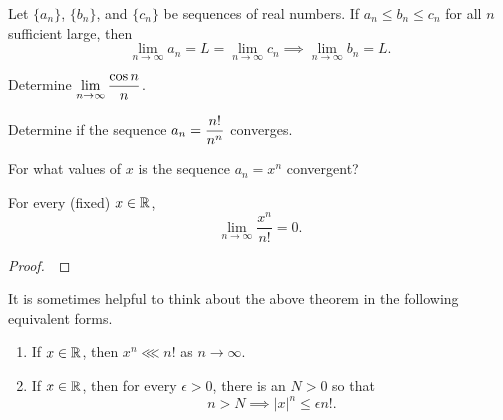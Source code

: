 \vfill

\newpage

\begin{theorem}
Let $\{a_n\}$, $\{b_n\}$, and $\{c_n\}$ be sequences of real numbers.
If $a_n\le b_n\le c_n$ for all $n$ sufficient large, then
\begin{equation*}
\lim_{n\to\infty}a_n = L = \lim_{n\to\infty}c_n \implies \lim_{n\to\infty}b_n= L.
\end{equation*}
\end{theorem}

\begin{example}
Determine $\displaystyle\lim_{n\to\infty}\frac{\cos n}{n}$.
\end{example}
\vfill

\begin{example}
Determine if the sequence $\displaystyle a_n=\frac{n!}{n^n}$ converges.
\end{example}
\vfill

\newpage

\begin{example}
For what values of $x$ is the sequence $a_n=x^n$ convergent?
\end{example}
\vfill

\newpage

\begin{theorem}
For every (fixed) $x\in\mathbb R$,
\begin{equation*}
\lim_{n\to\infty}\frac{x^n}{n!} = 0.
\end{equation*}
\end{theorem}
\begin{proof}\,

\vspace{6in}
\end{proof}

\begin{remark}
It is sometimes helpful to think about the above theorem in the following equivalent forms.
\begin{enumerate}
\item If $x\in\mathbb R$, then $x^n\lll n!$ as $n\to\infty$.
\item If $x\in\mathbb R$, then for every $\epsilon>0$, there is an $N>0$ so that
\begin{equation*}
n>N\implies |x|^n \le\epsilon n!.
\end{equation*}
\end{enumerate}
\end{remark}

\newpage

